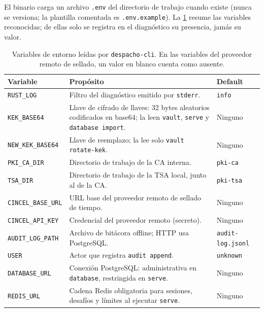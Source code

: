 El binario carga un archivo \texttt{.env} del directorio de trabajo cuando existe (nunca se versiona; la plantilla comentada es \texttt{.env.example}). La \cref{tab:cli-variables-entorno} resume las variables reconocidas; de ellas solo se registra en el diagnóstico su presencia, jamás su valor.

\begin{table}[H]
  \centering
  \caption{Variables de entorno leídas por \texttt{despacho-cli}. En las variables del proveedor remoto de sellado, un valor en blanco cuenta como ausente.}
  \label{tab:cli-variables-entorno}
  \begin{tabularx}{\linewidth}{@{}l >{\raggedright\arraybackslash}X l@{}}
    \toprule
    \textbf{Variable} & \textbf{Propósito} & \textbf{Default} \\
    \midrule
    \texttt{RUST\_LOG} & Filtro del diagnóstico emitido por \texttt{stderr}. & \texttt{info} \\
    \texttt{KEK\_BASE64} & Llave de cifrado de llaves: 32 bytes aleatorios codificados en base64; la leen \texttt{vault}, \texttt{serve} y \texttt{database import}. & Ninguno \\
    \texttt{NEW\_KEK\_BASE64} & Llave de reemplazo; la lee solo \texttt{vault rotate-kek}. & Ninguno \\
    \texttt{PKI\_CA\_DIR} & Directorio de trabajo de la CA interna. & \texttt{pki-ca} \\
    \texttt{TSA\_DIR} & Directorio de trabajo de la TSA local, junto al de la CA. & \texttt{pki-tsa} \\
    \texttt{CINCEL\_BASE\_URL} & URL base del proveedor remoto de sellado de tiempo. & Ninguno \\
    \texttt{CINCEL\_API\_KEY} & Credencial del proveedor remoto (secreto). & Ninguno \\
    \texttt{AUDIT\_LOG\_PATH} & Archivo de bitácora offline; HTTP usa PostgreSQL. & \texttt{audit-log.jsonl} \\
    \texttt{USER} & Actor que registra \texttt{audit append}. & \texttt{unknown} \\
    \texttt{DATABASE\_URL} & Conexión PostgreSQL: administrativa en \texttt{database}, restringida en \texttt{serve}. & Ninguno \\
    \texttt{REDIS\_URL} & Cadena Redis obligatoria para sesiones, desafíos y límites al ejecutar \texttt{serve}. & Ninguno \\
    \bottomrule
  \end{tabularx}
\end{table}

